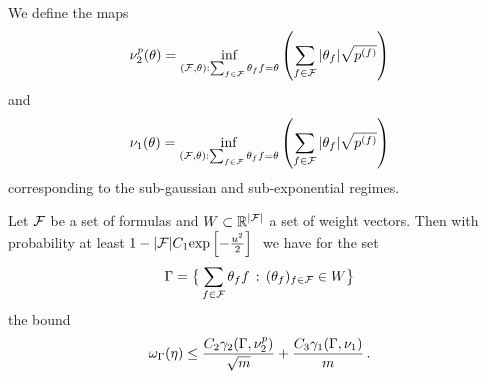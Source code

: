 We define the maps
	\[ \nu^p_2(\theta) =  \inf_{(\mathcal{F},\theta) : \sum_{f\in\mathcal{F}}\theta_{f}f = \theta}  \left( \sum_{f\in\mathcal{F}} |\theta_{f}| \sqrt{p^{(f)}} \right) \]
and
	\[ \nu_1(\theta) =  \inf_{(\mathcal{F},\theta) : \sum_{f\in\mathcal{F}}\theta_{f}f = \theta} \left( \sum_{f\in\mathcal{F}} |\theta_{f}| \sqrt{p^{(f)}} \right)  \]
corresponding to the sub-gaussian and sub-exponential regimes.


\begin{theorem}
	Let $\mathcal{F}$ be a set of formulas and $W\subset\mathbb{R}^{|\mathcal{F}|}$ a set of weight vectors.
	Then with probability at least $1- |\mlnformulaset| C_1 \expof{-\frac{u^2}{2}} $ we have for the set
		\[ \Gamma = \big\{\sum_{f\in\mathcal{F}}\theta_{f}f \, : \, (\theta_{f})_{f\in\mathcal{F}} \in W \big\} \]
	the bound
		\[ \omega_{\Gamma}(\eta)  \leq \frac{C_2 \gamma_{2}(\Gamma,\nu^p_2)}{\sqrt{m}} + \frac{C_3 \gamma_{1}(\Gamma,\nu_1)}{m} \, . \]
\end{theorem}




%
%
%
%
%
%

